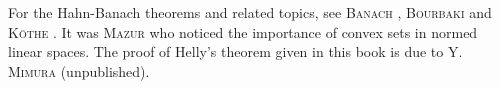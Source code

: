 
For the Hahn-Banach theorems and related topics, see \textsc{Banach} \cite{banach9}, \textsc{Bourbaki} \cite{bourbaki27} and \textsc{Köthe} \cite{konishi164}. It was \textsc{Mazur} \cite{mazur192} who noticed the importance of convex sets in normed linear spaces. The proof of Helly's theorem given in this book is due to Y. \textsc{Mimura} (unpublished). 
